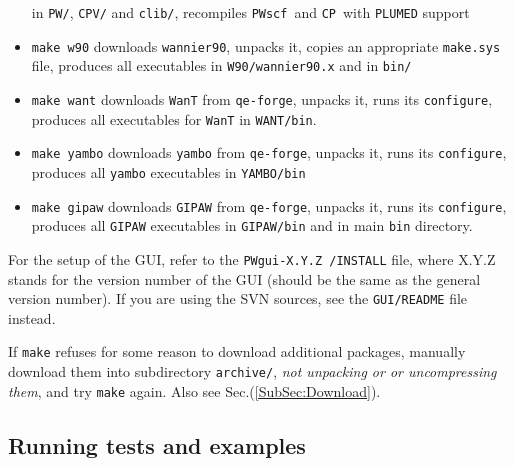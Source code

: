 \documentclass[12pt,a4paper]{article}
\def\configure{\texttt{configure}}
\def\PWscf{\texttt{PWscf}}
\def\CP{\texttt{CP}}
\begin{document}
\begin{itemize}
                           in \texttt{PW/}, \texttt{CPV/} and \texttt{clib/},
                           recompiles \PWscf\ and \CP\ with \texttt{PLUMED}
                           support
\item \texttt{make w90} downloads \texttt{wannier90}, unpacks it, copies an appropriate
                       \texttt{make.sys} file,  produces all executables
                       in \texttt{W90/wannier90.x} and in \texttt{bin/}
\item \texttt{make want} downloads \texttt{WanT} from \texttt{qe-forge}, 
			 unpacks it, runs its \configure,
                         produces all executables for \texttt{WanT} in 
                         \texttt{WANT/bin}.
\item \texttt{make yambo} downloads \texttt{yambo} from \texttt{qe-forge}, 
			  unpacks it, runs its \configure,
                          produces all \texttt{yambo} executables in 
                          \texttt{YAMBO/bin}
\item \texttt{make gipaw} downloads \texttt{GIPAW} from \texttt{qe-forge},
                          unpacks it, runs its \configure,
                          produces all \texttt{GIPAW} executables in 
                          \texttt{GIPAW/bin} and in main \texttt{bin} directory.
\end{itemize}
For the setup of the GUI, refer to the \texttt{PWgui-X.Y.Z /INSTALL} file, where
X.Y.Z stands for the version number of the GUI (should be the same as the
general version number). If you are using the SVN sources, see
the \texttt{GUI/README} file instead.

If \texttt{make} refuses for some reason to download additional 
packages, manually download them into subdirectory 
\texttt{archive/}, {\em not unpacking or or uncompressing them},
and try \texttt{make} again. Also see Sec.(\ref{SubSec:Download}).
   
\subsection{Running tests and examples}
\label{SubSec:Examples}

\end{document}

